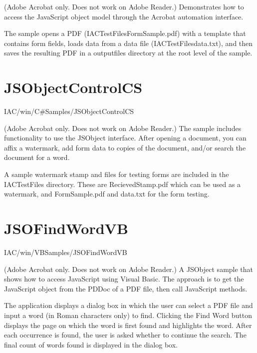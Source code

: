 \documentclass[letterpaper,12pt,english,openany,oneside]{sphinxmanual}
\begin{document}
(Adobe Acrobat only. Does not work on Adobe Reader.) Demonstrates how to access the JavaScript object model through the Acrobat automation interface.

The sample opens a PDF (IACTestFilesFormSample.pdf) with a template that contains form fields, loads data from a data file (IACTestFilesdata.txt), and then saves the resulting PDF in a outputfiles directory at the root level of the sample.


\section{JSObjectControlCS}
\label{\detokenize{Samples_WindowsIAC:jsobjectcontrolcs}}\label{\detokenize{Samples_WindowsIAC:location-18}}

IAC/win/C\#Samples/JSObjectControlCS

\label{\detokenize{Samples_WindowsIAC:description-18}}

(Adobe Acrobat only. Does not work on Adobe Reader.) The sample includes functionality to use the JSObject interface. After opening a document, you can affix a watermark, add form data to copies of the document, and/or search the document for a word.

A sample watermark stamp and files for testing forms are included in the IACTestFiles directory. These are RecievedStamp.pdf which can be used as a watermark, and FormSample.pdf and data.txt for the form testing.


\section{JSOFindWordVB}
\label{\detokenize{Samples_WindowsIAC:jsofindwordvb}}\label{\detokenize{Samples_WindowsIAC:location-19}}

IAC/win/VBSamples/JSOFindWordVB

\label{\detokenize{Samples_WindowsIAC:description-19}}

(Adobe Acrobat only. Does not work on Adobe Reader.) A JSObject sample that shows how to access JavaScript using Visual Basic. The approach is to get the JavaScript object from the PDDoc of a PDF file, then call JavaScript methods.

The application displays a dialog box in which the user can select a PDF file and input a word (in Roman characters only) to find. Clicking the Find Word button displays the page on which the word is first found and highlights the word. After each occurrence is found, the user is asked whether to continue the search. The final count of words found is displayed in the dialog box.
\end{document}
